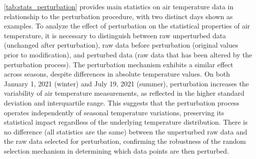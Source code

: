 \documentclass[authoryear,preprint,review,12pt]{elsarticle}
\begin{document}
\cref{tab:stats_perturbation} provides main statistics on air temperature data in relationship to the perturbation procedure, with two distinct days shown as examples.
To analyze the effect of perturbation on the statistical properties of air temperature, it is necessary to distinguish between raw unperturbed data (unchanged after perturbation), raw data before perturbation (original values prior to modification), and perturbed data (raw data that has been altered by the perturbation process).
The perturbation mechanism exhibits a similar effect across seasons, despite differences in absolute temperature values. On both January 1, 2021 (winter) and July 19, 2021 (summer), perturbation increases the variability of air temperature measurements, as reflected in the higher standard deviation and interquartile range. This suggests that the perturbation process operates independently of seasonal temperature variations, preserving its statistical impact regardless of the underlying temperature distribution.
There is no difference (all statistics are the same) between the unperturbed raw data and the raw data selected for perturbation, confirming the robustness of the random selection mechanism in determining which data points are then perturbed.
\end{document}
